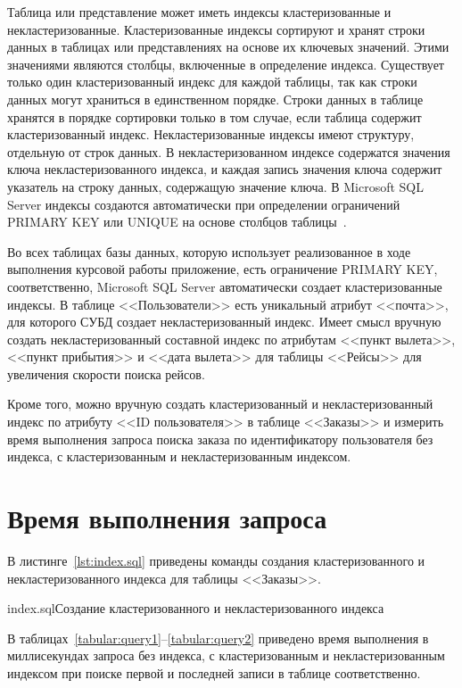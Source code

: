 \documentclass{bmstu}
\begin{document}
Таблица или представление может иметь индексы кластеризованные и некластеризованные. 
Кластеризованные индексы сортируют и хранят строки данных в таблицах или представлениях на основе их ключевых значений. 
Этими значениями являются столбцы, включенные в определение индекса. 
Существует только один кластеризованный индекс для каждой таблицы, так как строки данных могут храниться в единственном порядке. 
Строки данных в таблице хранятся в порядке сортировки только в том случае, если таблица содержит кластеризованный индекс. 
Некластеризованные индексы имеют структуру, отдельную от строк данных. 
В некластеризованном индексе содержатся значения ключа некластеризованного индекса, и каждая запись значения ключа содержит указатель на строку данных, содержащую значение ключа. 
В Microsoft SQL Server индексы создаются автоматически при определении ограничений PRIMARY KEY или UNIQUE на основе столбцов таблицы~\cite{Indices}.

Во всех таблицах базы данных, которую использует реализованное в ходе выполнения курсовой работы приложение, есть ограничение PRIMARY KEY, соответственно, Microsoft SQL Server автоматически создает кластеризованные индексы. 
В таблице <<Пользователи>> есть уникальный атрибут <<почта>>, для которого СУБД создает некластеризованный индекс. 
Имеет смысл вручную создать некластеризованный составной индекс по атрибутам <<пункт вылета>>, <<пункт прибытия>> и <<дата вылета>> для таблицы <<Рейсы>> для увеличения скорости поиска рейсов. 

Кроме того, можно вручную создать кластеризованный и некластеризованный индекс по атрибуту <<ID пользователя>> в таблице <<Заказы>> и измерить время выполнения запроса поиска заказа по идентификатору пользователя без индекса, с кластеризованным и некластеризованным индексом.

\section{Время выполнения запроса}

В листинге~\ref{lst:index.sql} приведены команды создания кластеризованного и некластеризованного индекса для таблицы <<Заказы>>.

{index.sql}{Создание кластеризованного и некластеризованного индекса}

В таблицах~\ref{tabular:query1}--\ref{tabular:query2} приведено время выполнения в миллисекундах запроса без индекса, с кластеризованным и некластеризованным индексом при поиске первой и последней записи в таблице соответственно.
\end{document}
